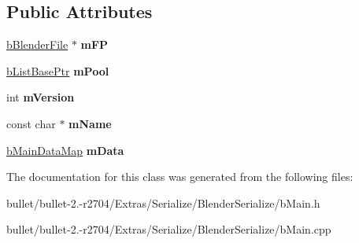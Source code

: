 \subsection*{Public Attributes}
\begin{DoxyCompactItemize}
\item 
\hypertarget{classb_parse_1_1b_main_a39a307ded673ee4eac4abfb8be5d5663}{\hyperlink{classb_parse_1_1b_blender_file}{b\+Blender\+File} $\ast$ {\bfseries m\+F\+P}}\label{classb_parse_1_1b_main_a39a307ded673ee4eac4abfb8be5d5663}

\item 
\hypertarget{classb_parse_1_1b_main_ae392d60e29ffd71a59ab3637a6772af0}{\hyperlink{classbt_aligned_object_array}{b\+List\+Base\+Ptr} {\bfseries m\+Pool}}\label{classb_parse_1_1b_main_ae392d60e29ffd71a59ab3637a6772af0}

\item 
\hypertarget{classb_parse_1_1b_main_a23190438d8dc28f45099c78137da7be0}{int {\bfseries m\+Version}}\label{classb_parse_1_1b_main_a23190438d8dc28f45099c78137da7be0}

\item 
\hypertarget{classb_parse_1_1b_main_a9730ddbceed98e2613f668ae85b6adc6}{const char $\ast$ {\bfseries m\+Name}}\label{classb_parse_1_1b_main_a9730ddbceed98e2613f668ae85b6adc6}

\item 
\hypertarget{classb_parse_1_1b_main_ab2e2bcd5b26b6f7b9ea9a6d37c39b3a7}{\hyperlink{classbt_hash_map}{b\+Main\+Data\+Map} {\bfseries m\+Data}}\label{classb_parse_1_1b_main_ab2e2bcd5b26b6f7b9ea9a6d37c39b3a7}

\end{DoxyCompactItemize}


The documentation for this class was generated from the following files\+:\begin{DoxyCompactItemize}
\item 
bullet/bullet-\/2.-\/r2704/\+Extras/\+Serialize/\+Blender\+Serialize/b\+Main.\+h\item 
bullet/bullet-\/2.-\/r2704/\+Extras/\+Serialize/\+Blender\+Serialize/b\+Main.\+cpp\end{DoxyCompactItemize}
